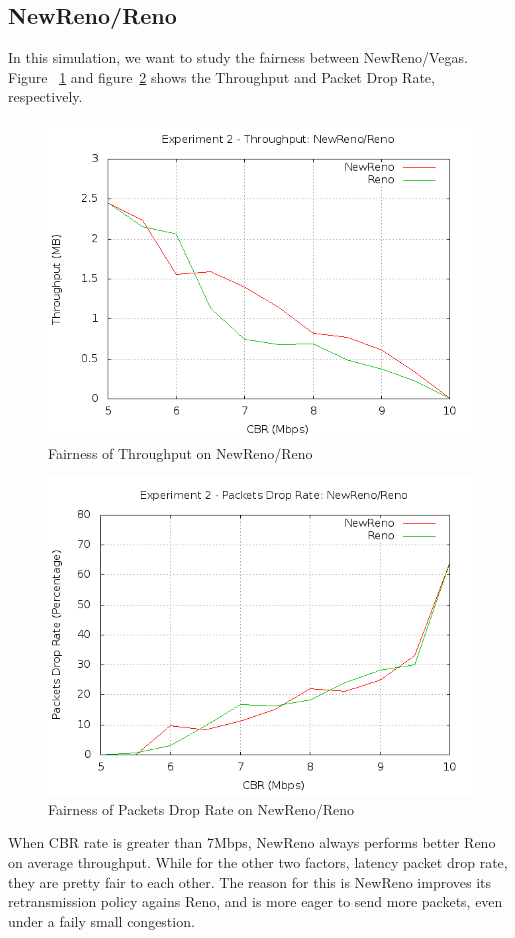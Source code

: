 \documentclass[10pt, conference]{lib/IEEEtran}
\begin{document}
\subsection{NewReno/Reno}
In this simulation, we want to study the fairness between NewReno/Vegas.
Figure ~\ref{fig:exp2_thp_nr} and figure~\ref{fig:exp2_dr_nr} shows the Throughput and Packet Drop Rate, respectively.
\begin{figure}[H]
    \centering
    \includegraphics[width=0.9\linewidth]{plot/exp2-thp-NewReno-Reno.png}
    \caption{Fairness of Throughput on NewReno/Reno}
    \label{fig:exp2_thp_nr}
\end{figure}
\begin{figure}[H]
    \centering
    \includegraphics[width=0.9\linewidth]{plot/exp2-dr-NewReno-Reno.png}
    \caption{Fairness of Packets Drop Rate on NewReno/Reno}
    \label{fig:exp2_dr_nr}
\end{figure}
When CBR rate is greater than 7Mbps, NewReno always performs better 
Reno on average throughput. While for the other two factors, latency 
packet drop rate, they are pretty fair to each other. The reason for
this is NewReno improves its retransmission policy agains Reno, and 
is more eager to send more packets, even under a faily small congestion.
\end{document}
